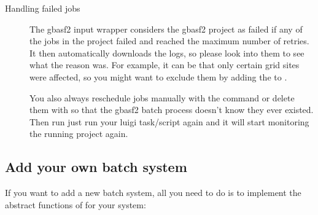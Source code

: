 \documentclass[letterpaper,10pt,english]{sphinxmanual}
\begin{document}
\begin{fulllineitems}
\begin{description}
\item[{Handling failed jobs}] \leavevmode
The gbasf2 input wrapper considers the gbasf2 project as failed if any of
the jobs in the project failed and reached the maximum number of retries.
It then automatically downloads the logs, so please look into them to see what the reason was.
For example, it can be that only certain grid sites were affected, so you might want to exclude them
by adding the  to .

You also always reschedule jobs manually with the  command or delete them with
 so that the gbasf2 batch process doesn’t know they ever
existed. Then run just run your luigi task/script again and it will start monitoring the running project
again.

\end{description}

\end{fulllineitems}



\subsection{Add your own batch system}
\label{\detokenize{usage/batch:add-your-own-batch-system}}
If you want to add a new batch system, all you need to do is to implement the
abstract functions of  for your system:
\end{document}
